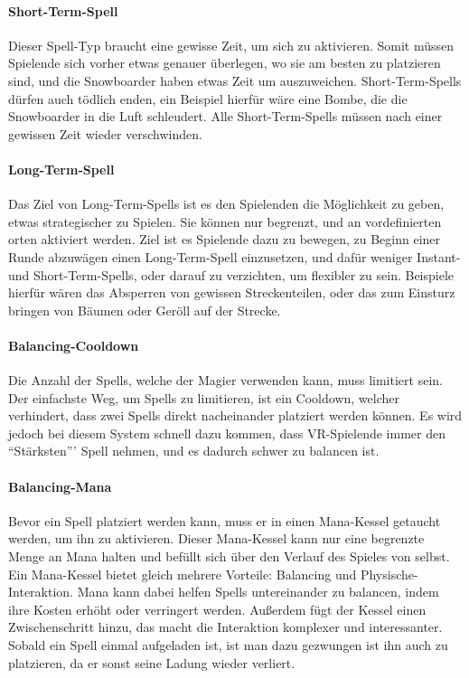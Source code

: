 \paragraph{Short-Term-Spell}
Dieser Spell-Typ braucht eine gewisse Zeit, um sich zu aktivieren. Somit müssen Spielende sich vorher etwas genauer überlegen, wo sie am besten zu platzieren sind, und die Snowboarder haben etwas Zeit um auszuweichen. Short-Term-Spells dürfen auch tödlich enden, ein Beispiel hierfür wäre eine Bombe, die die Snowboarder in die Luft schleudert. Alle Short-Term-Spells müssen nach einer gewissen Zeit wieder verschwinden.

\paragraph{Long-Term-Spell}
Das Ziel von Long-Term-Spells ist es den Spielenden die Möglichkeit zu geben, etwas strategischer zu Spielen. Sie können nur begrenzt, und an vordefinierten orten aktiviert werden. Ziel ist es Spielende dazu zu bewegen, zu Beginn einer Runde abzuwägen einen Long-Term-Spell einzusetzen, und dafür weniger Instant- und Short-Term-Spells, oder darauf zu verzichten, um flexibler zu sein. Beispiele hierfür wären das Absperren von gewissen Streckenteilen, oder das zum Einsturz bringen von Bäumen oder Geröll auf der Strecke.

\paragraph{Balancing-Cooldown}
Die Anzahl der Spells, welche der Magier verwenden kann, muss limitiert sein. Der einfachste Weg, um Spells zu limitieren, ist ein Cooldown, welcher verhindert, dass zwei Spells direkt nacheinander platziert werden können. Es wird jedoch bei diesem System schnell dazu kommen, dass VR-Spielende immer den "`Stärksten"'' Spell nehmen, und es dadurch schwer zu balancen ist.

\paragraph{Balancing-Mana\label{_mana}}
Bevor ein Spell platziert werden kann, muss er in einen Mana-Kessel getaucht werden, um ihn zu aktivieren. Dieser Mana-Kessel kann nur eine begrenzte Menge an Mana halten und befüllt sich über den Verlauf des Spieles von selbst. Ein Mana-Kessel bietet gleich mehrere Vorteile: Balancing und Physische-Interaktion. Mana kann dabei helfen Spells untereinander zu balancen, indem ihre Kosten erhöht oder verringert werden. Außerdem fügt der Kessel einen Zwischenschritt hinzu, das macht die Interaktion komplexer und interessanter. Sobald ein Spell einmal aufgeladen ist, ist man dazu gezwungen ist ihn auch zu platzieren, da er sonst seine Ladung wieder verliert.

